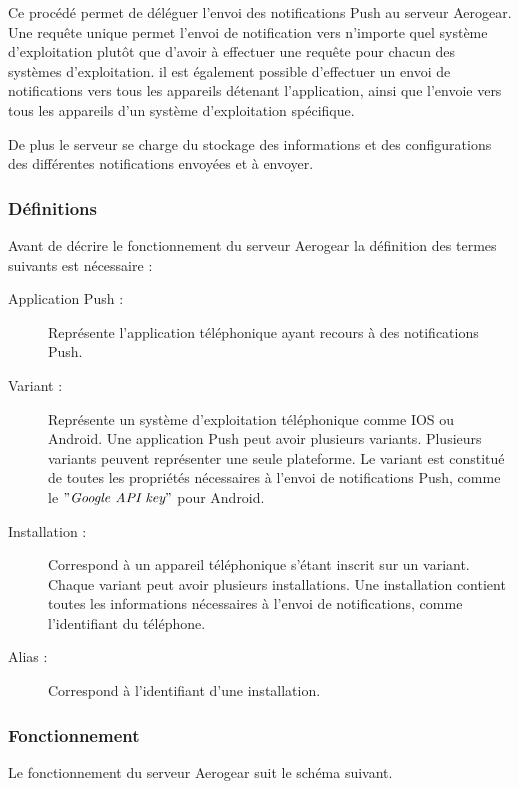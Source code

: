 Ce procédé permet de déléguer l'envoi des notifications Push au serveur Aerogear. Une requête unique permet l'envoi de notification vers n'importe quel système d'exploitation plutôt que d'avoir à effectuer une requête pour chacun des systèmes d'exploitation. il est également possible d'effectuer un envoi de notifications vers tous les appareils détenant l'application, ainsi que l'envoie vers tous les appareils d'un système d'exploitation spécifique.

De plus le serveur se charge du stockage des informations et des configurations des différentes notifications envoyées et à envoyer.

\subsubsection{Définitions} 

Avant de décrire le fonctionnement du serveur Aerogear la définition des termes suivants est nécessaire :

\begin{description}
	\item[Application Push :] Représente l'application téléphonique ayant recours à des notifications Push.
	\item[Variant :] Représente un système d'exploitation téléphonique comme IOS ou Android. Une application Push peut avoir plusieurs variants. Plusieurs variants peuvent représenter une seule plateforme. Le variant est constitué de toutes les propriétés nécessaires à l'envoi de notifications Push, comme le $"\textit{Google API key}"$ pour Android.
	\item[Installation :] Correspond à un appareil téléphonique s'étant inscrit sur un variant. Chaque variant peut avoir plusieurs installations. Une installation contient toutes les informations nécessaires à l'envoi de notifications, comme l'identifiant du téléphone.
	\item[Alias :] Correspond à l'identifiant d'une installation.
\end{description}

\subsubsection{Fonctionnement}

Le fonctionnement du serveur Aerogear suit le schéma suivant.

